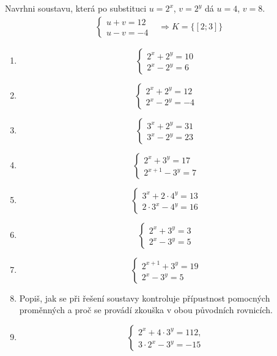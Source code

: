 \documentclass[11pt,a4paper]{article}
\begin{document}
\begin{zadaniReseniBox}[title={Rozšíření 1}]
Navrhni soustavu, která po substituci $u=2^x$, $v=2^y$ dá $u=4$, $v=8$.
\tcblower
\[
\begin{aligned}
\begin{cases}u+v=12\\u-v=-4\end{cases}
&\Longrightarrow K=\{[2;3]\}
\end{aligned}
\]
\end{zadaniReseniBox}
\begin{zadaniReseniBox}[title={Domácí úkol}]
\begin{enumerate}[label=\alph*)]
\item \[\begin{cases}2^x+2^y=10\\2^x-2^y=6\end{cases}\]
\item \[\begin{cases}2^x+2^y=12\\2^x-2^y=-4\end{cases}\]
\item \[\begin{cases}3^x+2^y=31\\3^x-2^y=23\end{cases}\]
\item \[\begin{cases}2^x+3^y=17\\2^{x+1}-3^y=7\end{cases}\]
\item \[\begin{cases}3^x+2\cdot4^y=13\\2\cdot3^x-4^y=16\end{cases}\]
\item \[\begin{cases}2^x+3^y=3\\2^x-3^y=5\end{cases}\]
\item \[\begin{cases}2^{x+1}+3^y=19\\2^x-3^y=5\end{cases}\]
\item Popiš, jak se při řešení soustavy kontroluje přípustnost pomocných proměnných a proč se provádí zkouška v obou původních rovnicích.
\item \[ \begin{cases}2^x+4\cdot3^y=112,\\3\cdot2^x-3^y=-15\end{cases} \]

\end{enumerate}
\end{zadaniReseniBox}
\end{document}
